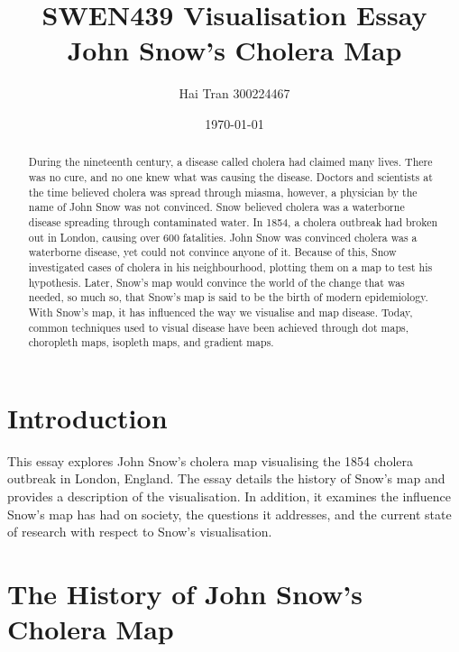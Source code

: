\documentclass[12pt]{article}
\title{SWEN439 Visualisation Essay \\ John Snow's Cholera Map}
\author{Hai Tran 300224467}
\date{\today}
\begin{document}
\maketitle 

\begin{abstract}

During the nineteenth century, a disease called cholera had claimed many lives. There was no cure, and no one knew what was causing the disease. Doctors and scientists at the time believed cholera was spread through miasma, however, a physician by the name of John Snow was not convinced. Snow believed cholera was a waterborne disease spreading through contaminated water. In 1854, a cholera outbreak had broken out in London, causing over 600 fatalities. John Snow was convinced cholera was a waterborne disease, yet could not convince anyone of it. Because of this, Snow investigated cases of cholera in his neighbourhood, plotting them on a map to test his hypothesis. Later, Snow's map would convince the world of the change that was needed, so much so, that Snow's map is said to be the birth of modern epidemiology. With Snow's map, it has influenced the way we visualise and map disease. Today, common techniques used to visual disease have been achieved through dot maps, choropleth maps, isopleth maps, and gradient maps.

\end{abstract}

\section{Introduction}

This essay explores John Snow's cholera map visualising the 1854 cholera outbreak in London, England. The essay details the history of Snow's map and provides a description of the visualisation. In addition, it examines the influence Snow's map has had on society, the questions it addresses, and the current state of research with respect to Snow's visualisation.

\section{The History of John Snow's Cholera Map}
\end{document}

